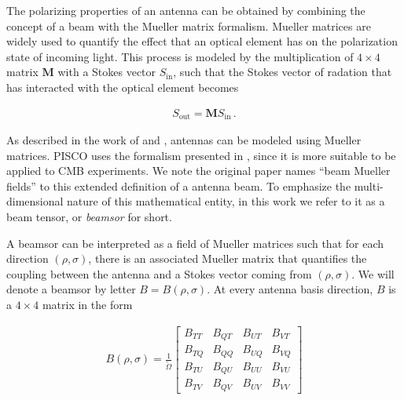 \documentclass[a4paper,11pt]{article}
\newcommand{\co}{\mathbin{\|}}
\newcommand{\cx}{\mathbin{\times}}
\begin{document}

The polarizing properties of an antenna can be obtained by combining the concept of a beam with the Mueller matrix formalism. Mueller matrices are widely used to quantify the effect that an optical element has on the polarization state of incoming light. This process is modeled by the multiplication of $4\times4$ matrix $\mathbf{M}$ with a Stokes vector $S_{\mathrm{in}}$, such that the Stokes vector of radation that has interacted with the optical element becomes

\begin{equation}
\begin{aligned}
S_{\mathrm{out}} = \mathbf{M} S_{\mathrm{in}} \, .
\end{aligned}
\end{equation}

\noindent
As described in the work of \cite{piepmeier_long_njoku_2008} and \cite{2007MNRAS.376.1767O}, antennas can be modeled using Mueller matrices. PISCO uses the formalism presented in \cite{2007MNRAS.376.1767O}, since it is more suitable to be applied to CMB experiments. We note the original paper names ``beam Mueller fields'' to this extended definition of a antenna beam. To emphasize the multi-dimensional nature of this mathematical entity, in this work we refer to it as a beam tensor, or \textsl{beamsor} for short.

A beamsor can be interpreted as a field of Mueller matrices such that for each direction $(\rho,\sigma)$, there is an associated Mueller matrix that quantifies the coupling between the antenna and a Stokes vector coming from $(\rho,\sigma)$. We will denote a beamsor by letter $B = B(\rho,\sigma)$. At every antenna basis direction, $B$ is a $4\times4$ matrix in the form

\begin{equation}
\begin{aligned}
B(\rho,\sigma) = \frac{1}{\tilde{\Omega}}
\begin{bmatrix}
B_{TT} & B_{QT} & B_{UT} & B_{VT}\\
B_{TQ} & B_{QQ} & B_{UQ} & B_{VQ}\\
B_{TU} & B_{QU} & B_{UU} & B_{VU}\\
B_{TV} & B_{QV} & B_{UV} & B_{VV}
\end{bmatrix}
\end{aligned}
\label{eq::beamsor}
\end{equation}
\end{document}

